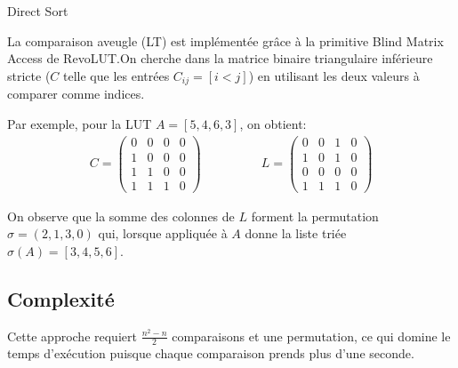 \documentclass{article}
\begin{document}
\begin{algorithm}
    \caption{Direct Sort}
    \begin{algorithmic}
            \State{$\sigma \gets [0; n]$}
                \EndFor{}
            \EndFor{}

        \EndFunction{}
    \end{algorithmic}
\end{algorithm}

La comparaison aveugle (LT) est implémentée grâce à la primitive Blind Matrix Access de RevoLUT.\@ On cherche dans la matrice binaire triangulaire inférieure stricte ($C$ telle que les entrées $C_{ij} = [i < j]$) en utilisant les deux valeurs à comparer comme indices.

\medskip

Par exemple, pour la LUT $A = [5, 4, 6, 3]$, on obtient:
\begin{align*}
    C = \begin{pmatrix}
        0 & 0 & 0 & 0 \\
        1 & 0 & 0 & 0 \\
        1 & 1 & 0 & 0 \\
        1 & 1 & 1 & 0
    \end{pmatrix} \qquad&\qquad
    L = \begin{pmatrix}
        0 & 0 & 1 & 0 \\
        1 & 0 & 1 & 0 \\
        0 & 0 & 0 & 0 \\
        1 & 1 & 1 & 0
    \end{pmatrix}
\end{align*}

On observe que la somme des colonnes de $L$ forment la permutation $\sigma = (2, 1, 3, 0)$ qui, lorsque appliquée à $A$ donne la liste triée $\sigma(A) = [3, 4, 5, 6]$.

\subsection{Complexité}

Cette approche requiert $\frac{n^2-n}{2}$ comparaisons et une permutation, ce qui domine le temps d'exécution puisque chaque comparaison prends plus d'une seconde.
\end{document}
